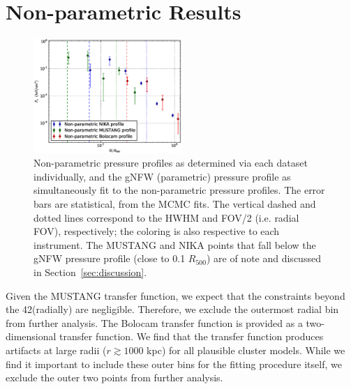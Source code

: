 \documentclass[twocolumn,traditabstract]{aa}
\begin{document}
\section{Non-parametric Results}
\label{sec:np_res}

\begin{figure}[!h]
  \centering
  \includegraphics[width=0.5\textwidth]{NIKA_ml_deproj_figs/Real_Joint_gNFW_Real_11011111_2500S_500B_100W_non_parametric_pressure.eps}
  \caption{Non-parametric pressure profiles as determined via each dataset individually, and the gNFW (parametric)
    pressure profile as simultaneously fit to the non-parametric pressure profiles. The error bars are statistical,
    from the MCMC fits. The vertical dashed and dotted
    lines correspond to the HWHM and FOV/2 (i.e. radial FOV), respectively; the coloring is also respective to each
    instrument. The MUSTANG and NIKA points that fall below the gNFW pressure profile (close to 0.1 $R_{500}$) are of
    note and discussed in Section~\ref{sec:discussion}.}
  \label{fig:joint_pressure}
\end{figure}

Given the MUSTANG transfer function, we expect that the constraints beyond the 42\asecs (radially) are negligible. Therefore,
we exclude the outermost radial bin from further analysis.
The Bolocam transfer function is provided as a two-dimensional transfer function. We find that the transfer function produces
artifacts at large radii ($r \gtrsim 1000$ kpc) for all plausible cluster models. While we find it important to include these
outer bins for the fitting procedure itself, we exclude the outer two points from further analysis.

\end{document}
